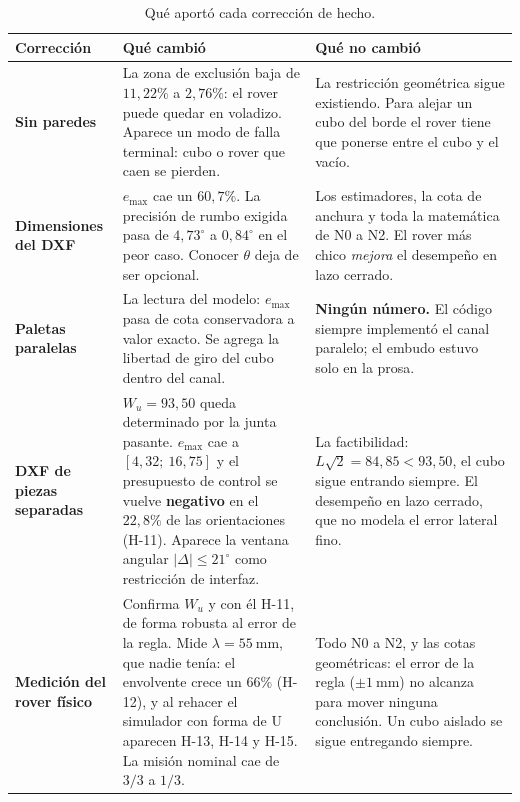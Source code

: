 \documentclass[11pt,a4paper]{article}
\newcommand{\grados}{^{\circ}}
\begin{document}
\begin{table}[htbp]
\centering
\small
\caption{Qué aportó cada corrección de hecho.}
\begin{tabular}{p{3.4cm}p{5.4cm}p{5.4cm}}
\toprule
Corrección & Qué cambió & Qué no cambió \\
\midrule
\textbf{Sin paredes} &
La zona de exclusión baja de $11{,}22\%$ a $2{,}76\%$: el rover puede quedar en
voladizo. Aparece un modo de falla terminal: cubo o rover que caen se pierden. &
La restricción geométrica sigue existiendo. Para alejar un cubo del borde el rover tiene
que ponerse entre el cubo y el vacío. \\
\addlinespace
\textbf{Dimensiones del DXF} &
$e_{\max}$ cae un $60{,}7\%$. La precisión de rumbo exigida pasa de $4{,}73\grados$ a
$0{,}84\grados$ en el peor caso. Conocer $\theta$ deja de ser opcional. &
Los estimadores, la cota de anchura y toda la matemática de N0 a N2. El rover más chico
\emph{mejora} el desempeño en lazo cerrado. \\
\addlinespace
\textbf{Paletas paralelas} &
La lectura del modelo: $e_{\max}$ pasa de cota conservadora a valor exacto. Se agrega la
libertad de giro del cubo dentro del canal. &
\textbf{Ningún número.} El código siempre implementó el canal paralelo; el embudo estuvo
solo en la prosa. \\
\addlinespace
\textbf{DXF de piezas separadas} &
$W_u = 93{,}50$ queda determinado por la junta pasante. $e_{\max}$ cae a
$[4{,}32;\ 16{,}75]$ y el presupuesto de control se vuelve \textbf{negativo} en el
$22{,}8\%$ de las orientaciones (H-11). Aparece la ventana angular $|\Delta|\le 21\grados$
como restricción de interfaz. &
La factibilidad: $L\sqrt2 = 84{,}85 < 93{,}50$, el cubo sigue entrando siempre. El
desempeño en lazo cerrado, que no modela el error lateral fino. \\
\addlinespace
\textbf{Medición del rover físico} &
Confirma $W_u$ y con él H-11, de forma robusta al error de la regla. Mide
$\lambda = 55\ \mathrm{mm}$, que nadie tenía: el envolvente crece un $66\%$ (H-12), y
al rehacer el simulador con forma de U aparecen H-13, H-14 y H-15. La misión nominal cae
de $3/3$ a $1/3$. &
Todo N0 a N2, y las cotas geométricas: el error de la regla ($\pm1\ \mathrm{mm}$) no
alcanza para mover ninguna conclusión. Un cubo aislado se sigue entregando siempre. \\
\bottomrule
\end{tabular}
\end{table}
\end{document}
